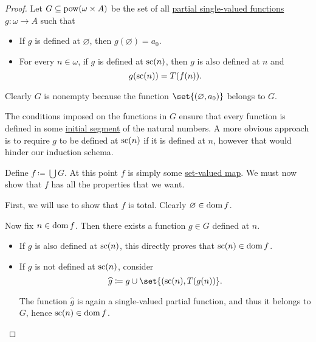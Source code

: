 \begin{proof}
  Let \( G \subseteq \operatorname{pow}(\omega \times A) \) be the set of all \hyperref[def:set_valued_map/partial]{partial single-valued functions} \( g: \omega \to A \) such that
  \begin{itemize}
    \item If \( g \) is defined at \( \varnothing \), then \( g(\varnothing) = a_0 \).
    \item For every \( n \in \omega \), if \( g \) is defined at \( \op{sc}(n) \), then \( g \) is also defined at \( n \) and
    \begin{equation*}
      g(\op{sc}(n)) = T(f(n)).
    \end{equation*}
  \end{itemize}

  Clearly \( G \) is nonempty because the function \( \set{ (\varnothing, a_0) } \) belongs to \( G \).

  The conditions imposed on the functions in \( G \) ensure that every function is defined in some \hyperref[def:order_interval/unbounded]{initial segment} of the natural numbers. A more obvious approach is to require \( g \) to be defined at \( \op{sc}(n) \) if it is defined at \( n \), however that would hinder our induction schema.

  Define \( f \coloneqq \bigcup G \). At this point \( f \) is simply some \hyperref[def:function]{set-valued map}. We must now show that \( f \) has all the properties that we want.

   First, we will use  to show that \( f \) is total. Clearly \( \varnothing \in \operatorname{dom} f \).

  Now fix \( n \in \operatorname{dom} f \). Then there exists a function \( g \in G \) defined at \( n \).

  \begin{itemize}
    \item If \( g \) is also defined at \( \op{sc}(n) \), this directly proves that \( \op{sc}(n) \in \dom f \).
    \item If \( g \) is not defined at \( \op{sc}(n) \), consider
    \begin{equation*}
      \widehat g \coloneqq g \cup \set{ (\op{sc}(n), T(g(n)) }.
    \end{equation*}

    The function \( \widehat g \) is again a single-valued partial function, and thus it belongs to \( G \), hence \( \op{sc}(n) \in \dom f \).
  \end{itemize}


\end{proof}
